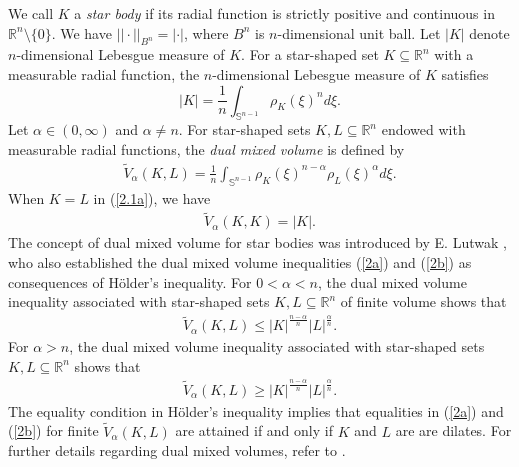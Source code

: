 \documentclass[preprint,12pt]{elsarticle}
\begin{document}
	We call $K$ a {\it star body} if its radial function is strictly positive and continuous in $\mathbb{R}^n \setminus \{0\}$.
	We have ${||\cdot ||}_{B^{n}} = |\cdot |$, where $B^{n}$ is $n$-dimensional unit ball. Let $|K|$ denote $n$-dimensional Lebesgue measure of $K$. For a star-shaped set $K \subseteq \mathbb{R}^{n}$ with a measurable radial function, the $n$-dimensional Lebesgue measure of $K$ satisfies 
	\begin{equation}\label{e2.1}
	|K|=\frac{1}{n}\int_{\mathbb{S}^{n-1}}{\rho}_{K}(\xi)^{n}d\xi.
\end{equation}
	Let $\alpha \in (0, \infty)$ and $\alpha \neq n$. For star-shaped sets $K, L \subseteq \mathbb{R}^n$ endowed with measurable radial functions, the {\it dual mixed volume} is defined by
	\begin{eqnarray}\label{2.1a}
		\widetilde{V}_{\alpha}\left ( K,L \right )=\frac{1}{n}\int_{\mathbb{S}^{n-1} }\rho_{K }\left ( \xi  \right ) ^{n-\alpha }\rho_{L}\left ( \xi  \right )^{\alpha }d\xi.
	\end{eqnarray}
When $K=L$ in (\ref{2.1a}), we have
\begin{eqnarray}
\widetilde{V}_{\alpha}\left (K,K\right)=|K|.\nonumber
\end{eqnarray}
The concept of dual mixed volume for star bodies was introduced by E. Lutwak \cite{EL75}, who also established the dual mixed volume inequalities (\ref{2a}) and (\ref{2b}) as consequences of H\"older’s inequality. For $0 < \alpha < n$, the dual mixed volume inequality associated with star-shaped sets $K, L \subseteq \mathbb{R}^n$ of finite volume shows that
\begin{eqnarray}\label{2a}
	\widetilde{V}_{\alpha} (K,L)\leq |K|^{\frac{n-\alpha}{n}}|L|^{\frac{\alpha}{n}}.
\end{eqnarray}
For  $\alpha> n$, the dual mixed volume inequality associated with star-shaped sets $K, L \subseteq \mathbb{R}^n$ shows that
\begin{eqnarray}\label{2b}
\widetilde{V}_{\alpha} (K,L)\geq |K|^{\frac{n-\alpha}{n}}|L|^{\frac{\alpha}{n}}.
\end{eqnarray}
The equality condition in H\"older’s inequality implies that equalities in (\ref{2a}) and (\ref{2b}) for finite $\widetilde{V}_{\alpha}\left (K,L\right)$ are attained if and only if $K$ and $L$ are are dilates. For further details regarding dual mixed volumes, refer to \cite{R. Gardner06,Schneider14}.
\end{document}
